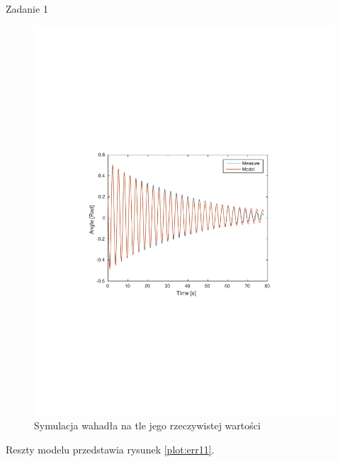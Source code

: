 \documentclass[12pt]{article}
\begin{document}
\begin{section}{Zadanie 1}
    \begin{figure}[!htb]
      \begin{center}
        \includegraphics[width=14cm,trim=3cm 8.5cm 3cm 9cm,clip]
        {../res/img/est11.pdf}
      \end{center}
      \caption{Symulacja wahadła na tle jego rzeczywistej wartości}
      \label{plot:est11}
    \end{figure}
    
    Reszty modelu przedstawia rysunek \ref{plot:err11}.


\end{section}
\end{document}
